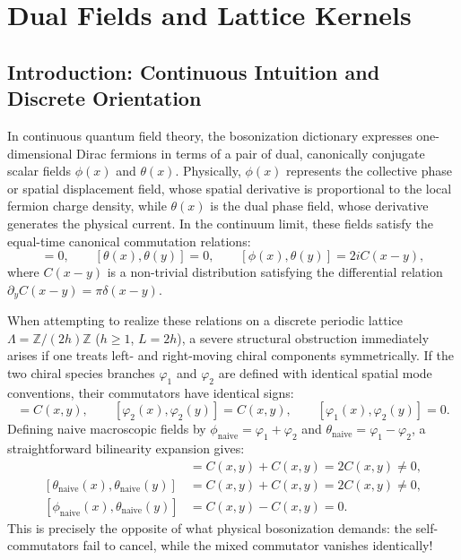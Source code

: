 \chapter{Dual Fields and Lattice Kernels}
\label{ch:dual_fields}

\section{Introduction: Continuous Intuition and Discrete Orientation}

In continuous quantum field theory, the bosonization dictionary expresses one-dimensional Dirac fermions in terms of a pair of dual, canonically conjugate scalar fields $\phi(x)$ and $\theta(x)$. Physically, $\phi(x)$ represents the collective phase or spatial displacement field, whose spatial derivative is proportional to the local fermion charge density, while $\theta(x)$ is the dual phase field, whose derivative generates the physical current. In the continuum limit, these fields satisfy the equal-time canonical commutation relations:
\begin{equation}
[\phi(x), \phi(y)] = 0, \qquad [\theta(x), \theta(y)] = 0, \qquad [\phi(x), \theta(y)] = 2i C(x - y),
\end{equation}
where $C(x - y)$ is a non-trivial distribution satisfying the differential relation $\partial_y C(x - y) = \pi \delta(x - y)$.

When attempting to realize these relations on a discrete periodic lattice $\Lambda = \mathbb{Z}/(2h)\mathbb{Z}$ ($h \ge 1$, $L = 2h$), a severe structural obstruction immediately arises if one treats left- and right-moving chiral components symmetrically. If the two chiral species branches $\varphi_1$ and $\varphi_2$ are defined with identical spatial mode conventions, their commutators have identical signs:
\begin{equation}
[\varphi_1(x), \varphi_1(y)] = C(x, y), \qquad [\varphi_2(x), \varphi_2(y)] = C(x, y), \qquad [\varphi_1(x), \varphi_2(y)] = 0.
\end{equation}
Defining naive macroscopic fields by $\phi_{\mathrm{naive}} = \varphi_1 + \varphi_2$ and $\theta_{\mathrm{naive}} = \varphi_1 - \varphi_2$, a straightforward bilinearity expansion gives:
\begin{align}
[\phi_{\mathrm{naive}}(x), \phi_{\mathrm{naive}}(y)] &= C(x, y) + C(x, y) = 2C(x, y) \neq 0, \\
[\theta_{\mathrm{naive}}(x), \theta_{\mathrm{naive}}(y)] &= C(x, y) + C(x, y) = 2C(x, y) \neq 0, \\
[\phi_{\mathrm{naive}}(x), \theta_{\mathrm{naive}}(y)] &= C(x, y) - C(x, y) = 0.
\end{align}
This is precisely the opposite of what physical bosonization demands: the self-commutators fail to cancel, while the mixed commutator vanishes identically!

